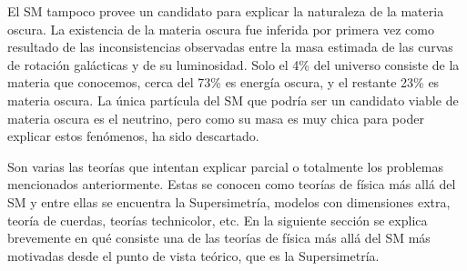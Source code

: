 El SM tampoco provee un candidato para explicar la naturaleza de la materia
oscura. La existencia de la materia oscura fue inferida por primera vez como
resultado de las inconsistencias observadas entre la masa estimada de las curvas
de rotación galácticas y de su luminosidad\cite{DM1}. Solo el 4\% del universo
consiste de la materia que conocemos\cite{DM2}, cerca del 73\% es
energía oscura, y el restante 23\% es materia oscura. La única partícula del SM
que podría ser un candidato viable de materia oscura es el neutrino, pero como
su masa es muy chica para poder explicar estos fenómenos, ha sido descartado.

Son varias las teorías que intentan explicar parcial o totalmente los problemas
mencionados anteriormente. Estas se conocen como teorías de física más allá del SM y entre
ellas se encuentra la Supersimetría, modelos con dimensiones extra, teoría de
cuerdas, teorías technicolor, etc. En la siguiente sección se explica brevemente
en qué consiste una de las teorías de física más allá del SM más motivadas desde
el punto de vista teórico, que es la Supersimetría.
